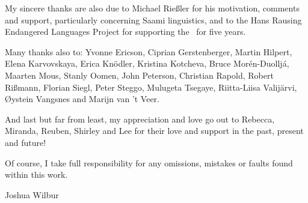 My sincere thanks are also due %
to Michael Rießler for his motivation, comments and support, particularly concerning Saami linguistics, and 
to the Hans Rausing Endangered Languages Project for supporting the \PSDP\ for five years. 

Many thanks also to:
Yvonne Ericson, 
Ciprian Gerstenberger, 
Martin Hilpert, 
Elena Karvovskaya, 
Erica Knödler, 
Kristina Kotcheva, 
Bruce Morén-Duoll\-já, 
Maar\-ten Mous, 
Stanly Oomen, 
John Peterson, 
Christian Rapold, 
Robert Rißmann, 
Florian Siegl, 
Peter Steggo, 
Mulugeta Tsegaye, 
Riitta-Liisa Valijärvi, 
Øystein Vangs\-nes 
and 
Marijn van ’t Veer. 

And last but far from least, my appreciation and love go out to Rebecca, Miranda, Reuben, Shirley and Lee for their love and support in the past, present and future!

Of course, I take full responsibility for any omissions, mistakes or faults found within this work. 

\hfill Joshua Wilbur

\hfill {}










%